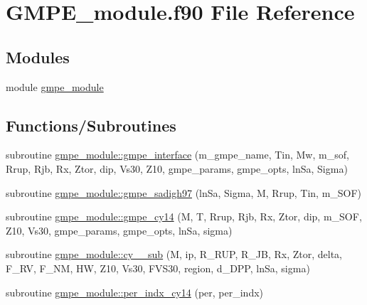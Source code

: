 \hypertarget{_g_m_p_e__module_8f90}{}\section{G\+M\+P\+E\+\_\+module.\+f90 File Reference}
\label{_g_m_p_e__module_8f90}
\subsection*{Modules}
\begin{DoxyCompactItemize}
\item 
module \hyperlink{namespacegmpe__module}{gmpe\+\_\+module}
\end{DoxyCompactItemize}
\subsection*{Functions/\+Subroutines}
\begin{DoxyCompactItemize}
\item 
subroutine \hyperlink{namespacegmpe__module_a5f684874da41cb0160ab7c0473b1adf5}{gmpe\+\_\+module\+::gmpe\+\_\+interface} (m\+\_\+gmpe\+\_\+name, Tin, Mw, m\+\_\+sof, Rrup, Rjb, Rx, Ztor, dip,                                           Vs30, Z10, gmpe\+\_\+params, gmpe\+\_\+opts,                                           ln\+Sa, Sigma)
\item 
subroutine \hyperlink{namespacegmpe__module_a3a1c1fc463d12762d4dcc724f90f876d}{gmpe\+\_\+module\+::gmpe\+\_\+sadigh97} (ln\+Sa, Sigma, M, Rrup, Tin, m\+\_\+\+S\+O\+F)
\item 
subroutine \hyperlink{namespacegmpe__module_a908fe9e90b79ba090e108746e35b4b02}{gmpe\+\_\+module\+::gmpe\+\_\+cy14} (M, T, Rrup, Rjb, Rx, Ztor, dip, m\+\_\+\+S\+O\+F, Z10, Vs30, gmpe\+\_\+params, gmpe\+\_\+opts, ln\+Sa, sigma)
\item 
subroutine \hyperlink{namespacegmpe__module_a2b7ab2b80fab7e94cfd35a2e5652bc5a}{gmpe\+\_\+module\+::cy\+\_\+\_\+sub} (M, ip, R\+\_\+\+R\+U\+P, R\+\_\+\+J\+B, Rx, Ztor, delta, F\+\_\+\+R\+V, F\+\_\+\+N\+M, H\+W, Z10, Vs30, F\+V\+S30, region, d\+\_\+\+D\+P\+P, ln\+Sa, sigma)
\item 
subroutine \hyperlink{namespacegmpe__module_aaef04e7344731f519aba25dbde1bfbc8}{gmpe\+\_\+module\+::per\+\_\+indx\+\_\+cy14} (per, per\+\_\+indx)
\end{DoxyCompactItemize}
